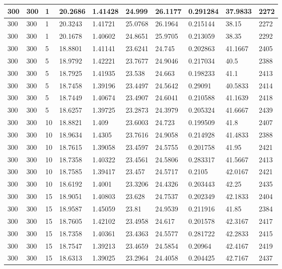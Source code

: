 \begin{landscape}
\begin{longtable}{ | l | l | l | l | l | l | l | l | l | l | }
300 & 300 & 1 & 20.2686 & 1.41428 & 24.999 & 26.1177 & 0.291284 & 37.9833 & 2272\\ \hline
300 & 300 & 1 & 20.3243 & 1.41721 & 25.0768 & 26.1964 & 0.215144 & 38.15 & 2272\\ \hline
300 & 300 & 1 & 20.1678 & 1.40602 & 24.8651 & 25.9705 & 0.213059 & 38.35 & 2292\\ \hline
300 & 300 & 5 & 18.8801 & 1.41141 & 23.6241 & 24.745 & 0.202863 & 41.1667 & 2405\\ \hline
300 & 300 & 5 & 18.9792 & 1.42221 & 23.7677 & 24.9046 & 0.217034 & 40.5 & 2388\\ \hline
300 & 300 & 5 & 18.7925 & 1.41935 & 23.538 & 24.663 & 0.198233 & 41.1 & 2413\\ \hline
300 & 300 & 5 & 18.7458 & 1.39196 & 23.4497 & 24.5642 & 0.29091 & 40.5833 & 2414\\ \hline
300 & 300 & 5 & 18.7449 & 1.40674 & 23.4907 & 24.6041 & 0.210588 & 41.1639 & 2418\\ \hline
300 & 300 & 5 & 18.6257 & 1.39725 & 23.2873 & 24.3979 & 0.205324 & 41.6667 & 2439\\ \hline
300 & 300 & 10 & 18.8821 & 1.409 & 23.6003 & 24.723 & 0.199509 & 41.8 & 2407\\ \hline
300 & 300 & 10 & 18.9634 & 1.4305 & 23.7616 & 24.9058 & 0.214928 & 41.4833 & 2388\\ \hline
300 & 300 & 10 & 18.7615 & 1.39058 & 23.4597 & 24.5755 & 0.201758 & 41.95 & 2421\\ \hline
300 & 300 & 10 & 18.7358 & 1.40322 & 23.4561 & 24.5806 & 0.283317 & 41.5667 & 2413\\ \hline
300 & 300 & 10 & 18.7585 & 1.39417 & 23.457 & 24.5717 & 0.2105 & 42.0167 & 2421\\ \hline
300 & 300 & 10 & 18.6192 & 1.4001 & 23.3206 & 24.4326 & 0.203443 & 42.25 & 2435\\ \hline
300 & 300 & 15 & 18.9051 & 1.40803 & 23.628 & 24.7537 & 0.202349 & 42.1833 & 2404\\ \hline
300 & 300 & 15 & 18.9587 & 1.45059 & 23.81 & 24.9539 & 0.211916 & 41.85 & 2384\\ \hline
300 & 300 & 15 & 18.7605 & 1.42102 & 23.4958 & 24.617 & 0.201578 & 42.3167 & 2417\\ \hline
300 & 300 & 15 & 18.7358 & 1.40361 & 23.4363 & 24.5577 & 0.281722 & 42.2833 & 2415\\ \hline
300 & 300 & 15 & 18.7547 & 1.39213 & 23.4659 & 24.5854 & 0.20964 & 42.4167 & 2419\\ \hline
300 & 300 & 15 & 18.6313 & 1.39025 & 23.2964 & 24.4058 & 0.204425 & 42.7167 & 2437\\ \hline

\end{longtable}
\end{landscape}
